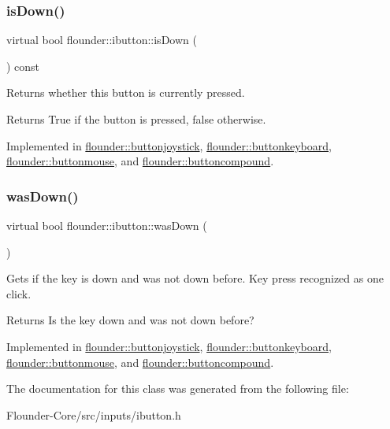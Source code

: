 \subsubsection{\texorpdfstring{is\+Down()}{isDown()}}
{\footnotesize\ttfamily virtual bool flounder\+::ibutton\+::is\+Down (\begin{DoxyParamCaption}{ }\end{DoxyParamCaption}) const\hspace{0.3cm}{\ttfamily [pure virtual]}}



Returns whether this button is currently pressed. 

\begin{DoxyReturn}{Returns}
True if the button is pressed, false otherwise. 
\end{DoxyReturn}


Implemented in \hyperlink{classflounder_1_1buttonjoystick_adf53e97310b757108a417f5d4e6c5ab0}{flounder\+::buttonjoystick}, \hyperlink{classflounder_1_1buttonkeyboard_a401cfc086e9729adbf8ac3c72ae59fca}{flounder\+::buttonkeyboard}, \hyperlink{classflounder_1_1buttonmouse_ad4f5435d1141e54169c96a4ff8ea8ab7}{flounder\+::buttonmouse}, and \hyperlink{classflounder_1_1buttoncompound_a60ac6caaca37cd841c725259906a9196}{flounder\+::buttoncompound}.

\mbox{\label{classflounder_1_1ibutton_a5fb7b3493c0ea0e67bb9defc272da0d3}} 
\subsubsection{\texorpdfstring{was\+Down()}{wasDown()}}
{\footnotesize\ttfamily virtual bool flounder\+::ibutton\+::was\+Down (\begin{DoxyParamCaption}{ }\end{DoxyParamCaption})\hspace{0.3cm}{\ttfamily [pure virtual]}}



Gets if the key is down and was not down before. Key press recognized as one click. 

\begin{DoxyReturn}{Returns}
Is the key down and was not down before? 
\end{DoxyReturn}


Implemented in \hyperlink{classflounder_1_1buttonjoystick_a99302b1345fa773ec839290ae6c406e7}{flounder\+::buttonjoystick}, \hyperlink{classflounder_1_1buttonkeyboard_abc6b3c8cf9398f2a896408e390fd3a01}{flounder\+::buttonkeyboard}, \hyperlink{classflounder_1_1buttonmouse_a7dad01481ebb01755db054a0acbc8159}{flounder\+::buttonmouse}, and \hyperlink{classflounder_1_1buttoncompound_ae14c6ee933dbc2550f16bc6307f20989}{flounder\+::buttoncompound}.



The documentation for this class was generated from the following file\+:\begin{DoxyCompactItemize}
\item 
Flounder-\/\+Core/src/inputs/ibutton.\+h\end{DoxyCompactItemize}
